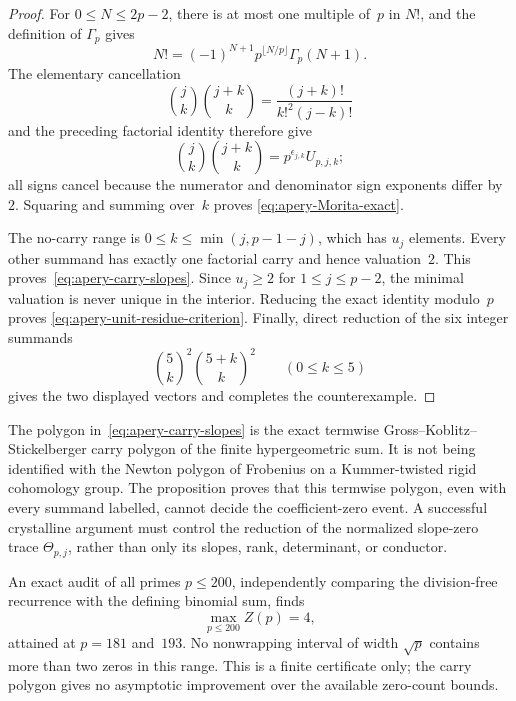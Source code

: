 \begin{proof}
For $0\leq N\leq2p-2$, there is at most one multiple of~$p$ in $N!$,
and the definition of $\Gamma_p$ gives
\[
 N!=(-1)^{N+1}p^{\lfloor N/p\rfloor}\Gamma_p(N+1).
\]
The elementary cancellation
\[
 \binom jk\binom{j+k}{k}
 =\frac{(j+k)!}{k!^2(j-k)!}
\]
and the preceding factorial identity therefore give
\[
 \binom jk\binom{j+k}{k}
 =p^{\epsilon_{j,k}}U_{p,j,k};
\]
all signs cancel because the numerator and denominator sign exponents
differ by~$2$.  Squaring and summing over~$k$ proves
\eqref{eq:apery-Morita-exact}.

The no-carry range is $0\leq k\leq\min(j,p-1-j)$, which has $u_j$
elements.  Every other summand has exactly one factorial carry and hence
valuation~$2$.  This proves~\eqref{eq:apery-carry-slopes}.  Since
$u_j\geq2$ for $1\leq j\leq p-2$, the minimal valuation is never unique
in the interior.  Reducing the exact identity modulo~$p$ proves
\eqref{eq:apery-unit-residue-criterion}.  Finally, direct reduction of the
six integer summands
\[
 \binom5k^2\binom{5+k}{k}^2\qquad(0\leq k\leq5)
\]
gives the two displayed vectors and completes the counterexample.
\end{proof}

\begin{remark}
\label{rem:apery-carry-polygon-scope}
The polygon in~\eqref{eq:apery-carry-slopes} is the exact termwise
Gross--Koblitz--Stickelberger carry polygon of the finite hypergeometric
sum.  It is not being identified with the Newton polygon of Frobenius on a
Kummer-twisted rigid cohomology group.  The proposition proves that this
termwise polygon, even with every summand labelled, cannot decide the
coefficient-zero event.  A successful crystalline argument must control
the reduction of the normalized slope-zero trace
$\Theta_{p,j}$, rather than only its slopes, rank, determinant, or
conductor.
\end{remark}

\begin{remark}
\label{rem:apery-carry-polygon-audit}
An exact audit of all primes $p\leq200$, independently comparing the
division-free recurrence with the defining binomial sum, finds
\[
 \max_{p\leq200}Z(p)=4,
\]
attained at $p=181$ and~$193$.  No nonwrapping interval of width
$\sqrt p$ contains more than two zeros in this range.  This is a finite
certificate only; the carry polygon gives no asymptotic improvement over
the available zero-count bounds.
\end{remark}
